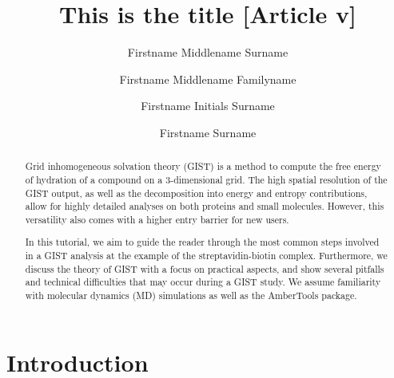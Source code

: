 \documentclass[9pt,tutorial]{livecoms}
\title{This is the title [Article v\versionnumber]}
\author[1*]{Firstname Middlename Surname}
\author[1,2\authfn{1}\authfn{3}]{Firstname Middlename Familyname}
\author[2\authfn{1}\authfn{4}]{Firstname Initials Surname}
\author[2*]{Firstname Surname}
\affil[1]{Institution 1}
\affil[2]{Institution 2}
\begin{document}
\begin{frontmatter}
\maketitle

\begin{abstract}
Grid inhomogeneous solvation theory (GIST) is a method to compute the free energy of hydration of a compound on a 3-dimensional grid.
The high spatial resolution of the GIST output, as well as the decomposition into energy and entropy contributions, allow for highly detailed analyses on both proteins and small molecules. However, this versatility also comes with a higher entry barrier for new users.

In this tutorial, we aim to guide the reader through the most common steps involved in a GIST analysis at the example of the streptavidin-biotin complex.
Furthermore, we discuss the theory of GIST with a focus on practical aspects, and show several pitfalls and technical difficulties that may occur during a GIST study.
We assume familiarity with molecular dynamics (MD) simulations as well as the AmberTools package.

%
\end{abstract}

\end{frontmatter}




\section{Introduction}
\end{document}
